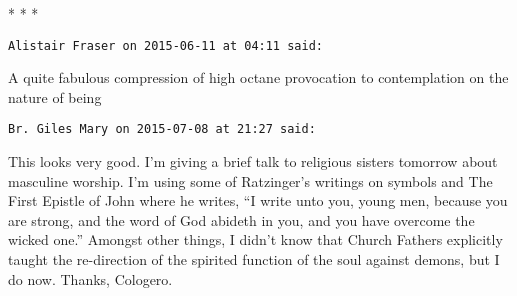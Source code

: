 
\begin{center}* * *\end{center}

\begin{footnotesize}\begin{sffamily}

\texttt{Alistair Fraser on 2015-06-11 at 04:11 said: }

A quite fabulous compression of high octane provocation to contemplation on the nature of being

\hfill

\texttt{Br. Giles Mary on 2015-07-08 at 21:27 said: }

This looks very good. I'm giving a brief talk to religious sisters tomorrow about masculine worship. I'm using some of Ratzinger's writings on symbols and The First Epistle of John where he writes, “I write unto you, young men, because you are strong, and the word of God abideth in you, and you have overcome the wicked one.” Amongst other things, I didn't know that Church Fathers explicitly taught the re-direction of the spirited function of the soul against demons, but I do now. Thanks, Cologero.

\hfill

\end{sffamily}\end{footnotesize}
